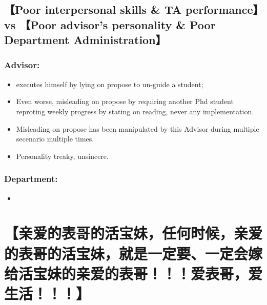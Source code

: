 \documentclass[9pt, b5paper]{article}
\begin{document}
\subsection{【Poor interpersonal skills \& TA performance】vs 【Poor advisor's personality \& Poor Department Administration】}
\label{sec-3-4}
\subsubsection{Advisor:}
\label{sec-3-4-1}
\begin{itemize}
\item executes himself by lying on propose to un-guide a student;
\item Even worse, misleading on propose by requiring another Phd student reproting weekly progress by stating on reading, never any implementation.
\item Misleading on propose has been manipulated by this Advisor during multiple secenario multiple times.
\item Personality treaky, unsincere.
\end{itemize}
\subsubsection{Department:}
\label{sec-3-4-2}
\begin{itemize}
\item 
\end{itemize}
\section{【亲爱的表哥的活宝妹，任何时候，亲爱的表哥的活宝妹，就是一定要、一定会嫁给活宝妹的亲爱的表哥！！！爱表哥，爱生活！！！】}
\label{sec-4}
\section{}
\label{sec-5}
\end{document}
